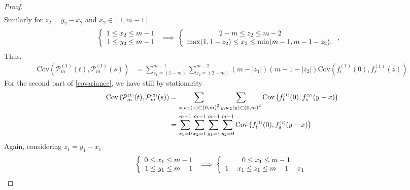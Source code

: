 \documentclass[12pt]{article}
\theoremstyle{Theorem}
\begin{document}
\begin{proof}
\begin{align*}
\end{align*} 
Similarly for $z_2 = y_2 - x_2$ and $x_2 \in [1, m-1]$
\begin{align*}
 \left\{
\begin{array}{rcl}
1 \leq x_2 \leq m-1 \\
1 \leq y_2 \leq m-1 
\end{array}\right. & \implies
\left\{
\begin{array}{rcl}
2-m \leq z_2 \leq m-2 \hspace{2.5cm}  \\
\max(1, 1-z_2) \leq x_2 \leq \min(m-1 , m-1-z_2).
\end{array}\right., 
\end{align*}
Thus,
\begin{align*}
\text{Cov}\left(\mathcal{P}_{m}^{\scriptscriptstyle (1)}(t),\mathcal{P}_{m}^{\scriptscriptstyle (1)}(s) \right) &  = \sum_{z_{\scriptscriptstyle 1} = \left(1-m\right)}^{m-1}\sum_{z_{\scriptscriptstyle 2}=\left(2-m\right)}^{m-2}\left(m -|z_{1}|\right)\left(m - 1- |z_{2}|\right) \text{Cov}\left(f_{t}^{\scriptscriptstyle (1)}(0), f_{s}^{\scriptscriptstyle (1)}(z) \right) 
\end{align*}
For the second part of \eqref{covariance}, we have still by stationarity
\begin{align*}
\text{Cov}\left(\mathcal{P}_{m}^{\scriptscriptstyle (1)}(t),\mathcal{P}_{m}^{\scriptscriptstyle (2)}(s) \right) & = \sum_{x, w_{1}(x) \subset \text{\larger[1]{$($}}0, m \text{\larger[1]{$)$}}^{2}} \sum_{y, w_{2}(y) \subset \text{\larger[1]{$($}}0, m \text{\larger[1]{$)$}}^{2}} \text{Cov}\left(f_{t}^{\scriptscriptstyle (1)}(0), f_{s}^{ \scriptscriptstyle (2)}(y-x) \right)\\
& =  \sum_{x_1 = 0}^{m-1}\sum_{x_2 = 1}^{m-1}\sum_{y_1 = 1}^{m-1}\sum_{y_2 = 0}^{m-1}\text{Cov}\left(f_{t}^{\scriptscriptstyle (1)}(0), f_{s}^{ \scriptscriptstyle (2)}(y-x) \right)
\end{align*}
Again, considering $z_1 = y_1 - x_1$
\begin{align*} 
\left\{
\begin{array}{rcl}
0 \leq x_1 \leq m-1 \\
1 \leq y_1 \leq m-1 
\end{array}\right.& \implies  \left\{ \begin{array}{rcl}
0 \leq x_1 \leq m-1 \hspace{0.7cm} \\
1 -x_1 \leq z_1 \leq m- 1 - x_1
\end{array}\right. \\

\end{align*}
\end{proof}
\end{document}
